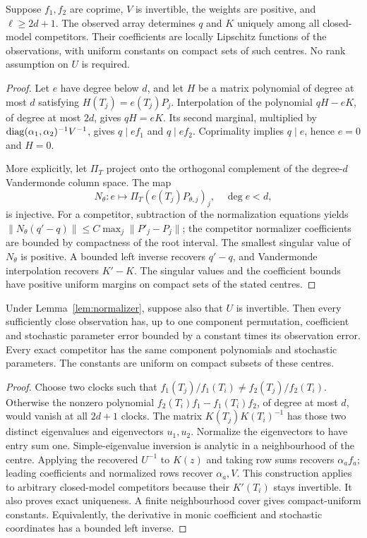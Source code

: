 \begin{lemma}\label{lem:normalizer}
Suppose $f_1,f_2$ are coprime, $V$ is invertible, the weights are positive,
and $\ell\ge2d+1$. The observed array determines $q$ and $K$ uniquely
among all closed-model competitors. Their coefficients are locally
Lipschitz functions of the observations, with uniform constants on
compact sets of such centres. No rank assumption on $U$ is required.
\end{lemma}
\begin{proof}
Let $e$ have degree below $d$, and let $H$ be a matrix polynomial of
degree at most $d$ satisfying $H(T_j)=e(T_j)P_j$. Interpolation of the
polynomial $qH-eK$, of degree at most $2d$, gives $qH=eK$.
Its second marginal, multiplied by
$\operatorname{diag}(\alpha_1,\alpha_2)^{-1}V^{-1}$, gives $q\mid ef_1$ and
$q\mid ef_2$. Coprimality implies $q\mid e$, hence $e=0$ and $H=0$.

More explicitly, let $\Pi_T$ project onto the orthogonal complement of
the degree-$d$ Vandermonde column space. The map
\[
 N_\theta:e\longmapsto\Pi_T(e(T_j)P_{\theta,j})_j,\quad\deg e<d,
\]
is injective. For a competitor, subtraction of the normalization
equations yields
$\|N_\theta(q'-q)\|\le C\max_j\|P'_j-P_j\|$; the competitor
normalizer coefficients are bounded by compactness of the root interval.
The smallest singular value of $N_\theta$ is positive. A bounded left
inverse recovers $q'-q$, and Vandermonde interpolation recovers $K'-K$.
The singular values and the coefficient bounds have positive uniform
margins on compact sets of the stated centres.
\end{proof}

\begin{lemma}\label{lem:fullrank}
Under Lemma~\ref{lem:normalizer}, suppose also that $U$ is invertible.
Then every sufficiently close observation has, up to one component
permutation, coefficient and stochastic parameter error bounded by a
constant times its observation error. Every exact competitor has the
same component polynomials and stochastic parameters. The constants
are uniform on compact subsets of these centres.
\end{lemma}
\begin{proof}
Choose two clocks such that
$f_1(T_j)/f_1(T_i)\ne f_2(T_j)/f_2(T_i)$. Otherwise the nonzero polynomial
$f_2(T_i)f_1-f_1(T_i)f_2$, of degree at most $d$, would vanish at all
$2d+1$ clocks. The matrix $K(T_j)K(T_i)^{-1}$ has those two distinct
eigenvalues and eigenvectors $u_1,u_2$. Normalize the eigenvectors to
have entry sum one. Simple-eigenvalue inversion is analytic in a
neighbourhood of the centre. Applying the recovered $U^{-1}$ to $K(z)$
and taking row sums recovers $\alpha_af_a$; leading coefficients and
normalized rows recover $\alpha_a,V$. This construction applies to
arbitrary closed-model competitors because their $K'(T_i)$ stays
invertible. It also proves exact uniqueness. A finite neighbourhood
cover gives compact-uniform constants. Equivalently, the derivative in
monic coefficient and stochastic coordinates has a bounded left inverse.
\end{proof}
